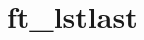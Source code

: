 \chapter{ft\+\_\+lstlast}
\hypertarget{md_Documentation_2ft__lstlast}{}\label{md_Documentation_2ft__lstlast}

